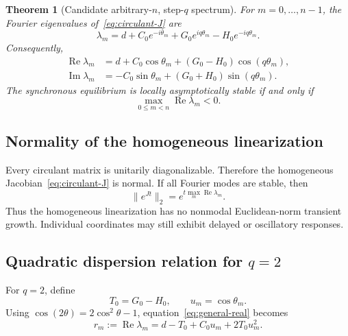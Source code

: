 \documentclass[11pt, reqno]{amsart}
\newtheorem{theorem}{Theorem}[section]
\theoremstyle{definition}
\theoremstyle{remark}
\newcommand{\Ree}{\operatorname{Re}}
\newcommand{\Imm}{\operatorname{Im}}
\begin{document}
	\begin{theorem}[Candidate arbitrary-$n$, step-$q$ spectrum]
		\label{thm:general-spectrum}
		For $m=0,\ldots,n-1$, the Fourier eigenvalues of~\eqref{eq:circulant-J} are
		\begin{equation}
			\label{eq:general-eigenvalue}
			\boxed{
				\lambda_m
				=
				d
				+C_0e^{-i\theta_m}
				+G_0e^{iq\theta_m}
				-H_0e^{-iq\theta_m}.
			}
		\end{equation}
		Consequently,
		\begin{align}
			\label{eq:general-real}
			\Ree\lambda_m
			&=
			d+C_0\cos\theta_m+(G_0-H_0)\cos(q\theta_m),\\
			\label{eq:general-imag}
			\Imm\lambda_m
			&=
			-C_0\sin\theta_m+(G_0+H_0)\sin(q\theta_m).
		\end{align}
		The synchronous equilibrium is locally asymptotically stable if and only if
		\[
		\max_{0\le m<n}\Ree\lambda_m<0.
		\]
	\end{theorem}
	
	
	\subsection{Normality of the homogeneous linearization}
	
	Every circulant matrix is unitarily diagonalizable.  Therefore the homogeneous
	Jacobian~\eqref{eq:circulant-J} is normal.  If all Fourier modes are stable,
	then
	\begin{equation}
		\label{eq:normal-decay}
		\|e^{Jt}\|_2
		=
		e^{t\max_m\Ree\lambda_m}.
	\end{equation}
	Thus the homogeneous linearization has no nonmodal Euclidean-norm transient
	growth.  Individual coordinates may still exhibit delayed or oscillatory
	responses.
	
	
	\subsection{Quadratic dispersion relation for $q=2$}
	
	For $q=2$, define
	\begin{equation}
		\label{eq:T-coefficient}
		T_0=G_0-H_0,
		\qquad
		u_m=\cos\theta_m.
	\end{equation}
	Using $\cos(2\theta)=2\cos^2\theta-1$, equation~\eqref{eq:general-real}
	becomes
	\begin{equation}
		\label{eq:quadratic-dispersion}
		r_m:=\Ree\lambda_m
		=d-T_0+C_0u_m+2T_0u_m^2.
	\end{equation}
	
\end{document}
